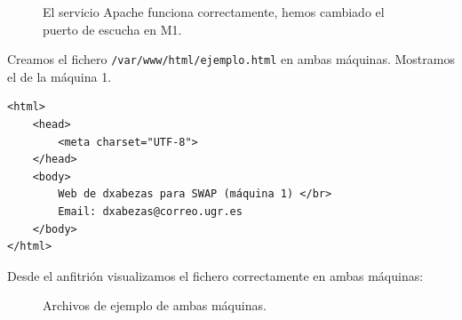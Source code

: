 \documentclass{article}
\begin{document}
\begin{figure}[H]
	\centering
	\caption{El servicio Apache funciona correctamente, hemos cambiado el puerto de escucha en M1.}
	\label{fig:apache-page}
\end{figure}

Creamos el fichero \texttt{/var/www/html/ejemplo.html} en ambas máquinas. Mostramos el de la máquina 1.

\begin{Verbatim}[tabsize=4]
<html>
	<head>
		<meta charset="UTF-8">
	</head>
	<body>
		Web de dxabezas para SWAP (máquina 1) </br>
		Email: dxabezas@correo.ugr.es
	</body>
</html>	
\end{Verbatim}

Desde el anfitrión visualizamos el fichero correctamente en ambas máquinas:

\begin{figure}[H]
	\centering
	\caption{Archivos de ejemplo de ambas máquinas.}
	\label{fig:ejemplo}
\end{figure}
\end{document}
